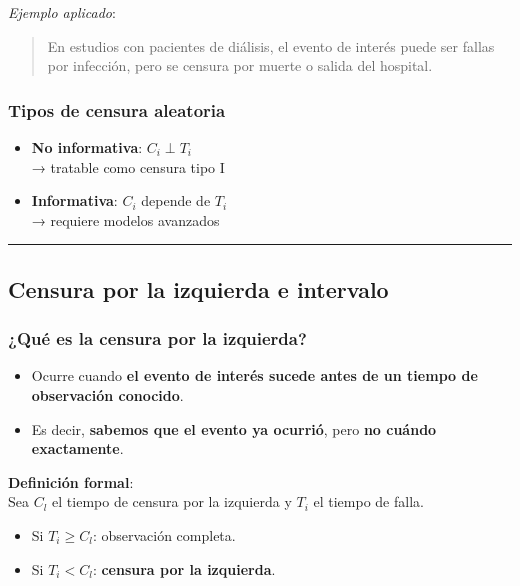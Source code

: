 \documentclass[
  letterpaper,
  DIV=11,
  numbers=noendperiod]{scrartcl}
\providecommand{\tightlist}{%
  \setlength{\itemsep}{0pt}\setlength{\parskip}{0pt}}
\begin{document}
\emph{Ejemplo aplicado}:

\begin{quote}
En estudios con pacientes de diálisis, el evento de interés puede ser
fallas por infección, pero se censura por muerte o salida del hospital.
\end{quote}

\subsubsection{Tipos de censura
aleatoria}\label{tipos-de-censura-aleatoria}

\begin{itemize}
\tightlist
\item
  \textbf{No informativa}: \(C_i \perp T_i\)\\
  → tratable como censura tipo I
\item
  \textbf{Informativa}: \(C_i\) depende de \(T_i\)\\
  → requiere modelos avanzados
\end{itemize}

\begin{center}\rule{0.5\linewidth}{0.5pt}\end{center}

\subsection{Censura por la izquierda e
intervalo}\label{censura-por-la-izquierda-e-intervalo}

\subsubsection{¿Qué es la censura por la
izquierda?}\label{quuxe9-es-la-censura-por-la-izquierda}

\begin{itemize}
\tightlist
\item
  Ocurre cuando \textbf{el evento de interés sucede antes de un tiempo
  de observación conocido}.
\item
  Es decir, \textbf{sabemos que el evento ya ocurrió}, pero \textbf{no
  cuándo exactamente}.
\end{itemize}

\textbf{Definición formal}:\\
Sea \(C_l\) el tiempo de censura por la izquierda y \(T_i\) el tiempo de
falla.

\begin{itemize}
\tightlist
\item
  Si \(T_i \ge C_l\): observación completa.\\
\item
  Si \(T_i < C_l\): \textbf{censura por la izquierda}.
\end{itemize}
\end{document}
